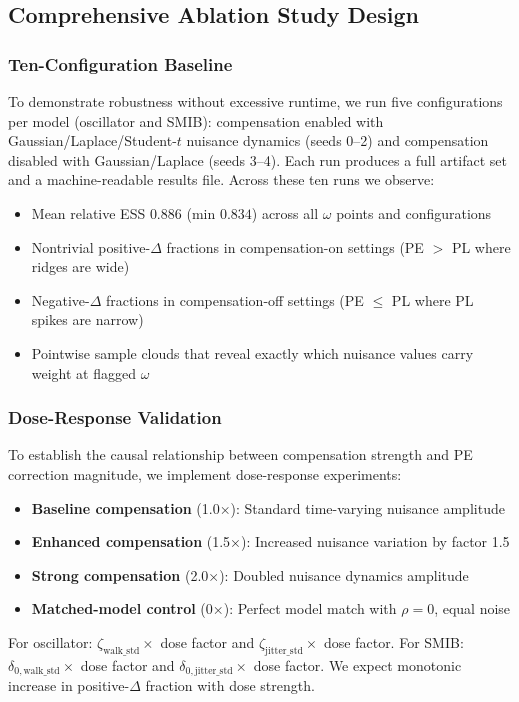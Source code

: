 \documentclass[conference]{IEEEtran}
\begin{document}
\subsection{Comprehensive Ablation Study Design}

\subsubsection{Ten-Configuration Baseline}
To demonstrate robustness without excessive runtime, we run five configurations per model (oscillator and SMIB): compensation enabled with Gaussian/Laplace/Student-$t$ nuisance dynamics (seeds 0--2) and compensation disabled with Gaussian/Laplace (seeds 3--4). Each run produces a full artifact set and a machine-readable results file. Across these ten runs we observe:
\begin{itemize}
\item Mean relative ESS $0.886$ (min $0.834$) across all $\omega$ points and configurations
\item Nontrivial positive-$\Delta$ fractions in compensation-on settings (PE $>$ PL where ridges are wide)
\item Negative-$\Delta$ fractions in compensation-off settings (PE $\le$ PL where PL spikes are narrow)
\item Pointwise sample clouds that reveal exactly which nuisance values carry weight at flagged $\omega$
\end{itemize}

\subsubsection{Dose-Response Validation}
To establish the causal relationship between compensation strength and PE correction magnitude, we implement dose-response experiments:
\begin{itemize}
\item \textbf{Baseline compensation} (1.0×): Standard time-varying nuisance amplitude
\item \textbf{Enhanced compensation} (1.5×): Increased nuisance variation by factor 1.5
\item \textbf{Strong compensation} (2.0×): Doubled nuisance dynamics amplitude
\item \textbf{Matched-model control} (0×): Perfect model match with $\rho=0$, equal noise
\end{itemize}

For oscillator: $\zeta_{\text{walk\_std}} \times$ dose factor and $\zeta_{\text{jitter\_std}} \times$ dose factor. For SMIB: $\delta_{0,\text{walk\_std}} \times$ dose factor and $\delta_{0,\text{jitter\_std}} \times$ dose factor. We expect monotonic increase in positive-$\Delta$ fraction with dose strength.
\end{document}
